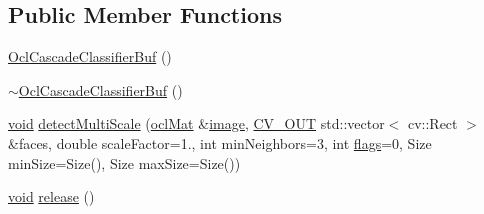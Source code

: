 \subsection*{Public Member Functions}
\begin{DoxyCompactItemize}
\item 
\hyperlink{classcv_1_1ocl_1_1OclCascadeClassifierBuf_ad527e7ff21eb00dc7c9f121455bef3e8}{Ocl\-Cascade\-Classifier\-Buf} ()
\item 
\hyperlink{classcv_1_1ocl_1_1OclCascadeClassifierBuf_accca87b8ff411c578068904c15ff2083}{$\sim$\-Ocl\-Cascade\-Classifier\-Buf} ()
\item 
\hyperlink{legacy_8hpp_a8bb47f092d473522721002c86c13b94e}{void} \hyperlink{classcv_1_1ocl_1_1OclCascadeClassifierBuf_afd9b033c6b96e2a870b37d2a4f38c8fd}{detect\-Multi\-Scale} (\hyperlink{classcv_1_1ocl_1_1oclMat}{ocl\-Mat} \&\hyperlink{legacy_8hpp_ad62b16ab219ae2483e8a3d921c44cc97}{image}, \hyperlink{core_2types__c_8h_a4e999bc21cb894d3ed789f3f0bc26778}{C\-V\-\_\-\-O\-U\-T} std\-::vector$<$ cv\-::\-Rect $>$ \&faces, double scale\-Factor=1., int min\-Neighbors=3, int \hyperlink{highgui__c_8h_ae51e3a2d4365e85db9630dd3ce9508db}{flags}=0, Size min\-Size=Size(), Size max\-Size=Size())
\item 
\hyperlink{legacy_8hpp_a8bb47f092d473522721002c86c13b94e}{void} \hyperlink{classcv_1_1ocl_1_1OclCascadeClassifierBuf_ad1cab73adc261104379a440a4cf39874}{release} ()
\end{DoxyCompactItemize}


